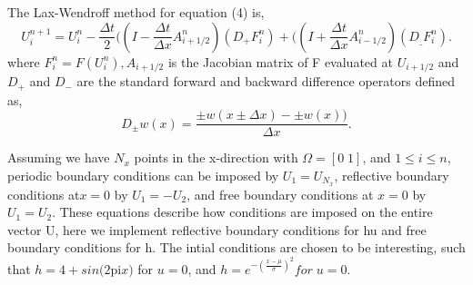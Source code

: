The Lax-Wendroff method for equation (4) is,
\begin{equation}\label{eqn:4}
U_i^{n+1}=U_i^n-\frac{{\Delta t}}{2}((I-\frac{{\Delta t}}{{\Delta x}}A_{i+1/2}^n)(D_+F_i^n)+((I+\frac{{\Delta
t}}{{\Delta x}}A_{i-1/2}^n)(D_{\_}F_i^n).
\end{equation}
where \(F_i^n=F(U_i^n), A_{i+1/2}\) is the Jacobian matrix of F evaluated at \(U_{i+1/2}\) and \(D_+\) and \(D_-\) are the standard forward
and backward difference operators defined as,
\begin{equation}\label{eqn:5}
D_{\pm }w(x)=\frac{\pm w(x\pm {\Delta x})-\pm w(x))}{{\Delta x}}. 
\end{equation}

Assuming we have \(N_x\) points in the x-direction with \(\Omega =[0\;1]\), and \(1\leq i\leq n\), periodic boundary
conditions can be imposed by \(U_1=U_{N_x}\), reflective boundary conditions at\(x=0\) by \(U_1=-U_2\), and free boundary conditions at \(x=0\) by
\(U_1=U_2\). These equations describe how conditions are imposed on the entire vector U, here we implement reflective boundary
conditions for hu and free boundary conditions for h. The intial conditions are chosen to be interesting, such that $h=4+sin(2$pi$x)$ for $u=0$, and
 $h=e^{-(\frac{x-\mu }{\sigma })^2}for \; u=0$. \newline

